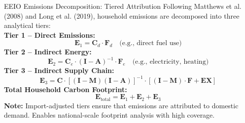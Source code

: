 \documentclass{beamer}
\begin{document}
\begin{frame}{EEIO Emissions Decomposition: Tiered Attribution}
\footnotesize
\vspace{-2.0em}
\pause
Following Matthews et al. (2008) and Long et al. (2019), household emissions are decomposed into three analytical tiers:\\
\pause
\vspace{0.5em}
\textbf{Tier 1 – Direct Emissions:}
\[
\mathbf{E}_1 = \mathbf{C}_d \cdot \mathbf{F}_d
\quad \text{(e.g., direct fuel use)}
\]
\pause
\textbf{Tier 2 – Indirect Energy:}
\[
\mathbf{E}_2 = \mathbf{C}_e \cdot (\mathbf{I} - \mathbf{A})^{-1} \cdot \mathbf{F}_e
\quad \text{(e.g., electricity, heating)}
\]
\pause
\textbf{Tier 3 – Indirect Supply Chain:}
\[
\mathbf{E}_3 = \mathbf{C} \cdot \left[(\mathbf{I} - \mathbf{M})(\mathbf{I} - \mathbf{A})\right]^{-1} \cdot \left[(\mathbf{I} - \mathbf{M}) \cdot \mathbf{F} + \mathbf{EX}\right]
\]
\pause
\vspace{0.5em}
\textbf{Total Household Carbon Footprint:}
\[
\mathbf{E}_{\text{total}} = \mathbf{E}_1 + \mathbf{E}_2 + \mathbf{E}_3
\]
\pause
\vspace{0.5em}
\textbf{Note:}  
Import-adjusted tiers ensure that emissions are attributed to domestic demand. Enables national-scale footprint analysis with high coverage.

\end{frame}
\end{document}
